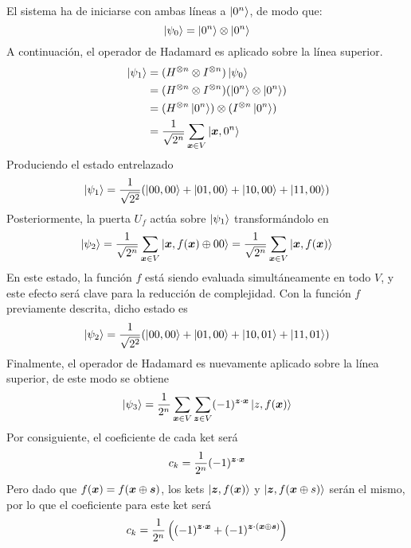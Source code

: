 El sistema ha de iniciarse con ambas líneas a $\ket{0^n}$, de modo que:
%
$$ \ket{\psi_0} = \ket{0^n} \otimes \ket{0^n} $$
%
A continuación, el operador de Hadamard es aplicado sobre la línea superior.
%
\begin{equation}
\begin{split}
\ket{\psi_1} & = (H^{\otimes n} \otimes I^{\otimes n}) \ket{\psi_0} \\
	& = (H^{\otimes n} \otimes I^{\otimes n}) (\ket{0^n} \otimes \ket{0^n}) \\
	& = (H^{\otimes n} \ket{0^n}) \otimes (I^{\otimes n} \ket{0^n}) \\
	& = \frac{1}{\sqrt{2^n}} \sum_{\boldsymbol{x} \in V} \ket{\boldsymbol{x}, 0^n}
\end{split}
\end{equation}
%
Produciendo el estado entrelazado
%
\begin{equation}
\ket{\psi_1} = \frac{1}{\sqrt{2^2}} (\ket{00,00} + \ket{01,00} + \ket{10,00} + 
\ket{11,00})
\end{equation}
%
Posteriormente, la puerta $U_f$ actúa sobre $\ket{\psi_1}$ transformándolo en
%
\begin{equation}
\ket{\psi_2} = \frac{1}{\sqrt{2^n}} \sum_{\boldsymbol{x} \in V} \ket{\boldsymbol{x}, f(\boldsymbol{x}) \oplus 00} = 
\frac{1}{\sqrt{2^n}} \sum_{\boldsymbol{x} \in V} \ket{\boldsymbol{x}, f(\boldsymbol{x})}
\end{equation}
%
En este estado, la función $f$ está siendo evaluada simultáneamente en todo $V$, 
y este efecto será clave para la reducción de complejidad. Con la función $f$ 
previamente descrita, dicho estado es
%
\begin{equation}
\ket{\psi_2} = \frac{1}{\sqrt{2^2}} (\ket{00,00} + \ket{01,00} + \ket{10,01} + 
\ket{11,01})
\end{equation}
%
Finalmente, el operador de Hadamard es nuevamente aplicado sobre la línea 
superior, de este modo se obtiene
%
\begin{equation}
\ket{\psi_3} = \frac{1}{2^n} \sum_{\boldsymbol{x} \in V} \sum_{\boldsymbol{z} \in V}
	(-1)^{\boldsymbol{z} \cdot \boldsymbol{x}} \ket{z, f(\boldsymbol{x})}
\end{equation}
%
Por consiguiente, el coeficiente de cada ket será
%
\begin{equation}
c_k = \frac{1}{2^n} (-1)^{\boldsymbol{z} \cdot \boldsymbol{x}}
\end{equation}
%
Pero dado que $f(\boldsymbol{x}) = f(\boldsymbol{x} \oplus \boldsymbol{s})$, los kets $\ket{\boldsymbol{z}, f(\boldsymbol{x})}$ y
$\ket{\boldsymbol{z}, f(\boldsymbol{x} \oplus s)}$ serán el mismo, por lo que el coeficiente para
este ket será
%
\begin{equation}
c_k = \frac{1}{2^n} \left((-1)^{\boldsymbol{z} \cdot \boldsymbol{x}} + (-1)^{\boldsymbol{z} \cdot (\boldsymbol{x} \oplus 
\boldsymbol{s})}\right)
\end{equation}

